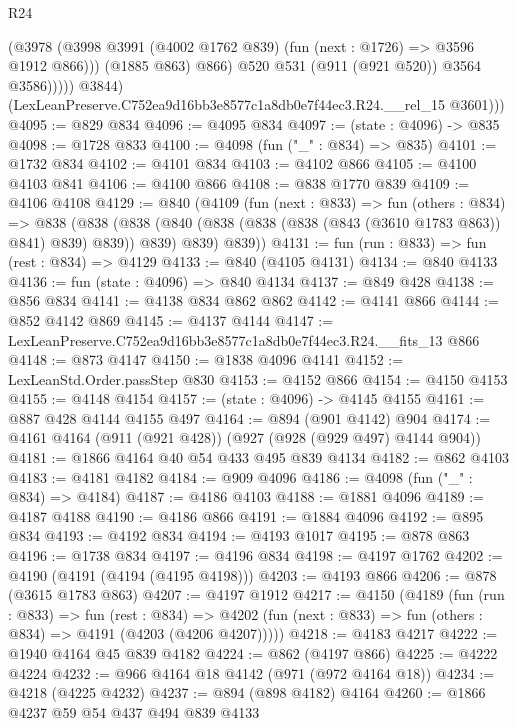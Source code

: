 \begin{lexlean}{R24}
\begin{coremodule}
                      (@3978
                        (@3998 @3991 (@4002 @1762 @839) (fun (next : @1726) => @3596 @1912 @866)))
                      (@1885 @863)
                      @866)
                    @520
                    @531
                    (@911 (@921 @520))
                    @3564
                    @3586)))))
          @3844)
        (LexLeanPreserve.C752ea9d16bb3e8577c1a8db0e7f44ec3.R24.__rel_15 @3601)))
@4095 := @829 @834
@4096 := @4095 @834
@4097 := (state : @4096) -> @835
@4098 := @1728 @833
@4100 := @4098 (fun ("_" : @834) => @835)
@4101 := @1732 @834
@4102 := @4101 @834
@4103 := @4102 @866
@4105 := @4100 @4103 @841
@4106 := @4100 @866
@4108 := @838 @1770 @839
@4109 := @4106 @4108
@4129 := @840
    (@4109
      (fun (next : @833) =>
      fun (others : @834) =>
      @838
        (@838 (@838 (@840 (@838 (@838 (@838 (@843 (@3610 @1783 @863)) @841) @839) @839)) @839) @839)
        @839))
@4131 := fun (run : @833) => fun (rest : @834) => @4129
@4133 := @840 (@4105 @4131)
@4134 := @840 @4133
@4136 := fun (state : @4096) => @840 @4134
@4137 := @849 @428
@4138 := @856 @834
@4141 := @4138 @834 @862 @862
@4142 := @4141 @866
@4144 := @852 @4142 @869
@4145 := @4137 @4144
@4147 := LexLeanPreserve.C752ea9d16bb3e8577c1a8db0e7f44ec3.R24.__fits_13 @866
@4148 := @873 @4147
@4150 := @1838 @4096 @4141
@4152 := LexLeanStd.Order.passStep @830
@4153 := @4152 @866
@4154 := @4150 @4153
@4155 := @4148 @4154
@4157 := (state : @4096) -> @4145 @4155
@4161 := @887 @428 @4144 @4155 @497
@4164 := @894 (@901 @4142) @904
@4174 := @4161 @4164 (@911 (@921 @428)) (@927 (@928 (@929 @497) @4144 @904))
@4181 := @1866 @4164 @40 @54 @433 @495 @839 @4134
@4182 := @862 @4103
@4183 := @4181 @4182
@4184 := @909 @4096
@4186 := @4098 (fun ("_" : @834) => @4184)
@4187 := @4186 @4103
@4188 := @1881 @4096
@4189 := @4187 @4188
@4190 := @4186 @866
@4191 := @1884 @4096
@4192 := @895 @834
@4193 := @4192 @834
@4194 := @4193 @1017
@4195 := @878 @863
@4196 := @1738 @834
@4197 := @4196 @834
@4198 := @4197 @1762
@4202 := @4190 (@4191 (@4194 (@4195 @4198)))
@4203 := @4193 @866
@4206 := @878 (@3615 @1783 @863)
@4207 := @4197 @1912
@4217 := @4150
    (@4189
      (fun (run : @833) =>
      fun (rest : @834) =>
      @4202 (fun (next : @833) => fun (others : @834) => @4191 (@4203 (@4206 @4207)))))
@4218 := @4183 @4217
@4222 := @1940 @4164 @45 @839 @4182
@4224 := @862 (@4197 @866)
@4225 := @4222 @4224
@4232 := @966 @4164 @18 @4142 (@971 (@972 @4164 @18))
@4234 := @4218 (@4225 @4232)
@4237 := @894 (@898 @4182) @4164
@4260 := @1866
    @4237
    @59
    @54
    @437
    @494
    @839
    @4133

\end{coremodule}
\end{lexlean}
